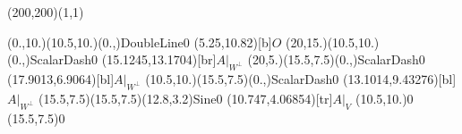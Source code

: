 \unitlength=1bp%

\begin{feynartspicture}(200,200)(1,1)

\FADiagram{}
\FAProp(0.,10.)(10.5,10.)(0.,){DoubleLine}{0}
\FALabel(5.25,10.82)[b]{$O$}
\FAProp(20,15.)(10.5,10.)(0.,){ScalarDash}{0}
\FALabel(15.1245,13.1704)[br]{$A|_{W^\perp}$}
\FAProp(20,5.)(15.5,7.5)(0.,){ScalarDash}{0}
\FALabel(17.9013,6.9064)[bl]{$A|_{W^\perp}$}
\FAProp(10.5,10.)(15.5,7.5)(0.,){ScalarDash}{0}
\FALabel(13.1014,9.43276)[bl]{$A|_{W^\perp}$}
\FAProp(15.5,7.5)(15.5,7.5)(12.8,3.2){Sine}{0}
\FALabel(10.747,4.06854)[tr]{$A|_V$}
\FAVert(10.5,10.){0}
\FAVert(15.5,7.5){0}
\end{feynartspicture}

